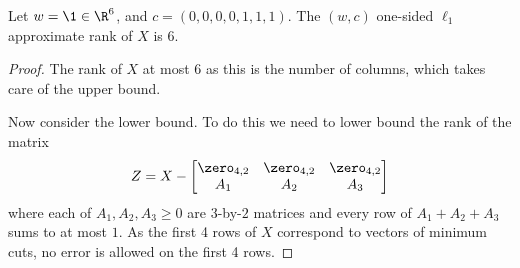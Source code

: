\begin{claim}
Let $w = \1 \in \R^6$, and $c =(0,0,0,0,1,1,1)$.  The $(w,c)$ one-sided $\ell_1$ approximate
rank of $X$ is $6$.
\end{claim}

\begin{proof}
The rank of $X$ at most $6$ as this is the number of columns, which takes care of the upper bound.

Now consider the lower bound.  To do this we need to lower bound the rank of the matrix
\[
Z=
X -
\begin{bmatrix}
\zero_{4,2} & \zero_{4,2} & \zero_{4,2} \\
A_1 & A_2 & A_3
\end{bmatrix}
\]
where each of $A_1, A_2,A_3 \ge 0$ are $3$-by-$2$ matrices and every row of $A_1 + A_2 + A_3$ sums to at most $1$.
As the first 4 rows of $X$ correspond to vectors of minimum cuts, no error is allowed on the first 4 rows.


\end{proof}
